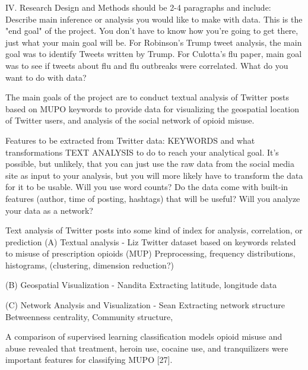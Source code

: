 \documentclass[sigconf]{acmart}
\begin{document}
IV. Research Design and Methods should be 2-4 paragraphs and include: 
Describe main inference or analysis you would like to make with data. This is the "end goal" of the project. You don't have to know how you're going to get there, just what your main goal will be. For Robinson's Trump tweet analysis, the main goal was to identify Tweets written by Trump. For Culotta's flu paper, main goal was to see if tweets about flu and flu outbreaks were correlated. What do you want to do with data?

The main goals of the project are to conduct textual analysis of Twitter posts based on MUPO keywords to provide data for visualizing the geospatial location of Twitter users, and analysis of the social network of opioid misuse.   

Features to be extracted from Twitter data: KEYWORDS and what transformations TEXT ANALYSIS to do to reach your analytical goal. It's possible, but unlikely, that you can just use the raw data from the social media site as input to your analysis, but you will more likely have to transform the data for it to be usable. Will you use word counts? Do the data come with built-in features (author, time of posting, hashtags) that will be useful? Will you analyze your data as a network?

Text analysis of Twitter posts into some kind of index for analysis, correlation, or prediction
(A) Textual analysis - Liz 
Twitter dataset based on keywords related to misuse of prescription opioids (MUP) 
Preprocessing, frequency distributions, histograms, 
(clustering, dimension reduction?)




(B) Geospatial Visualization - Nandita
Extracting latitude, longitude data




(C) Network Analysis and Visualization - Sean 
Extracting network structure
Betweenness centrality, Community structure, 

A comparison of supervised learning classification models opioid misuse and abuse revealed that treatment, heroin use, cocaine use, and tranquilizers were important features for classifying MUPO [27]. 
\end{document}

